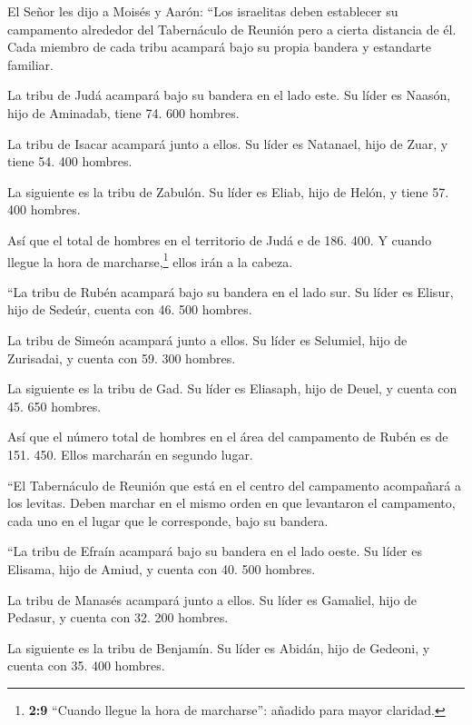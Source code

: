  El Señor les dijo a Moisés y Aarón:  ``Los
israelitas deben establecer su campamento alrededor del Tabernáculo de
Reunión pero a cierta distancia de él. Cada miembro de cada tribu
acampará bajo su propia bandera y estandarte familiar.

 La tribu de Judá acampará bajo su bandera en el lado
este. Su líder es Naasón, hijo de Aminadab,  tiene 74. 600
hombres.

 La tribu de Isacar acampará junto a ellos. Su líder es
Natanael, hijo de Zuar,  y tiene 54. 400 hombres.

 La siguiente es la tribu de Zabulón. Su líder es Eliab,
hijo de Helón,  y tiene 57. 400 hombres.

 Así que el total de hombres en el territorio de Judá e de
186. 400. Y cuando llegue la hora de marcharse,\footnote{\textbf{2:9}
  ``Cuando llegue la hora de marcharse'': añadido para mayor claridad.}
ellos irán a la cabeza.

 ``La tribu de Rubén acampará bajo su bandera en el lado
sur. Su líder es Elisur, hijo de Sedeúr,  cuenta con 46.
500 hombres.

 La tribu de Simeón acampará junto a ellos. Su líder es
Selumiel, hijo de Zurisadai,  y cuenta con 59. 300
hombres.

 La siguiente es la tribu de Gad. Su líder es Eliasaph,
hijo de Deuel,  y cuenta con 45. 650 hombres.

 Así que el número total de hombres en el área del
campamento de Rubén es de 151. 450. Ellos marcharán en segundo lugar.

 ``El Tabernáculo de Reunión que está en el centro del
campamento acompañará a los levitas. Deben marchar en el mismo orden en
que levantaron el campamento, cada uno en el lugar que le corresponde,
bajo su bandera.

 ``La tribu de Efraín acampará bajo su bandera en el lado
oeste. Su líder es Elisama, hijo de Amiud,  y cuenta con
40. 500 hombres.

 La tribu de Manasés acampará junto a ellos. Su líder es
Gamaliel, hijo de Pedasur,  y cuenta con 32. 200 hombres.

 La siguiente es la tribu de Benjamín. Su líder es
Abidán, hijo de Gedeoni,  y cuenta con 35. 400 hombres.

